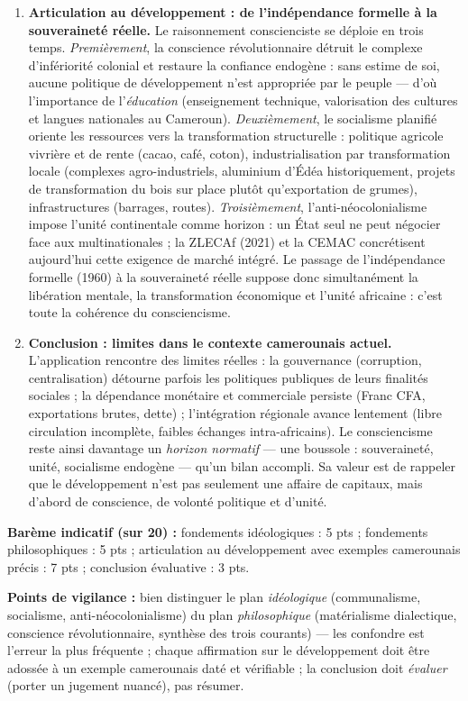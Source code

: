 \documentclass[11pt]{article}
\begin{document}
\begin{corrige}
\begin{enumerate}
\begin{itemize}
\end{itemize}
\item \textbf{Articulation au développement : de l'indépendance formelle à la souveraineté réelle.} Le raisonnement conscienciste se déploie en trois temps. \emph{Premièrement}, la conscience révolutionnaire détruit le complexe d'infériorité colonial et restaure la confiance endogène : sans estime de soi, aucune politique de développement n'est appropriée par le peuple — d'où l'importance de l'\emph{éducation} (enseignement technique, valorisation des cultures et langues nationales au Cameroun). \emph{Deuxièmement}, le socialisme planifié oriente les ressources vers la transformation structurelle : politique agricole vivrière et de rente (cacao, café, coton), industrialisation par transformation locale (complexes agro-industriels, aluminium d'Édéa historiquement, projets de transformation du bois sur place plutôt qu'exportation de grumes), infrastructures (barrages, routes). \emph{Troisièmement}, l'anti-néocolonialisme impose l'unité continentale comme horizon : un État seul ne peut négocier face aux multinationales ; la ZLECAf (2021) et la CEMAC concrétisent aujourd'hui cette exigence de marché intégré. Le passage de l'indépendance formelle (1960) à la souveraineté réelle suppose donc simultanément la libération mentale, la transformation économique et l'unité africaine : c'est toute la cohérence du consciencisme.
\item \textbf{Conclusion : limites dans le contexte camerounais actuel.} L'application rencontre des limites réelles : la gouvernance (corruption, centralisation) détourne parfois les politiques publiques de leurs finalités sociales ; la dépendance monétaire et commerciale persiste (Franc CFA, exportations brutes, dette) ; l'intégration régionale avance lentement (libre circulation incomplète, faibles échanges intra-africains). Le consciencisme reste ainsi davantage un \emph{horizon normatif} — une boussole : souveraineté, unité, socialisme endogène — qu'un bilan accompli. Sa valeur est de rappeler que le développement n'est pas seulement une affaire de capitaux, mais d'abord de conscience, de volonté politique et d'unité.
\end{enumerate}

\textbf{Barème indicatif (sur 20) :} fondements idéologiques : 5 pts ; fondements philosophiques : 5 pts ; articulation au développement avec exemples camerounais précis : 7 pts ; conclusion évaluative : 3 pts.

\textbf{Points de vigilance :} bien distinguer le plan \emph{idéologique} (communalisme, socialisme, anti-néocolonialisme) du plan \emph{philosophique} (matérialisme dialectique, conscience révolutionnaire, synthèse des trois courants) — les confondre est l'erreur la plus fréquente ; chaque affirmation sur le développement doit être adossée à un exemple camerounais daté et vérifiable ; la conclusion doit \emph{évaluer} (porter un jugement nuancé), pas résumer.
\end{corrige}
\end{document}
